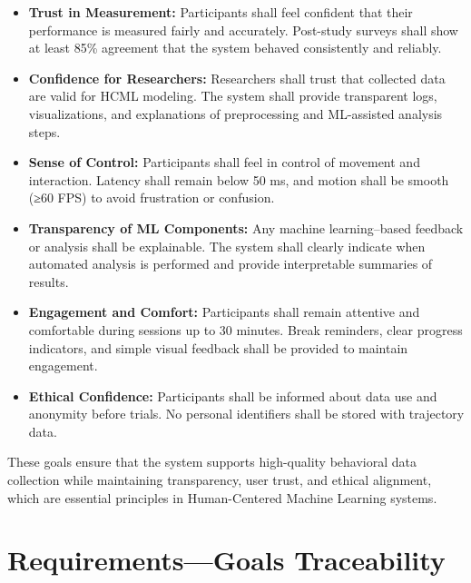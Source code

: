 \documentclass[sigconf]{acmart}
\begin{document}
\begin{itemize}

\item \textbf{Trust in Measurement:}
Participants shall feel confident that their performance is measured fairly and accurately. Post-study surveys shall show at least 85\% agreement that the system behaved consistently and reliably.

\item \textbf{Confidence for Researchers:}
Researchers shall trust that collected data are valid for HCML modeling. The system shall provide transparent logs, visualizations, and explanations of preprocessing and ML-assisted analysis steps.

\item \textbf{Sense of Control:}
Participants shall feel in control of movement and interaction. Latency shall remain below 50 ms, and motion shall be smooth (≥60 FPS) to avoid frustration or confusion.

\item \textbf{Transparency of ML Components:}
Any machine learning–based feedback or analysis shall be explainable. The system shall clearly indicate when automated analysis is performed and provide interpretable summaries of results.

\item \textbf{Engagement and Comfort:}
Participants shall remain attentive and comfortable during sessions up to 30 minutes. Break reminders, clear progress indicators, and simple visual feedback shall be provided to maintain engagement.

\item \textbf{Ethical Confidence:}
Participants shall be informed about data use and anonymity before trials. No personal identifiers shall be stored with trajectory data.

\end{itemize}

These goals ensure that the system supports high-quality behavioral data collection while maintaining transparency, user trust, and ethical alignment, which are essential principles in Human-Centered Machine Learning systems.




\section{Requirements—Goals Traceability}
\end{document}
